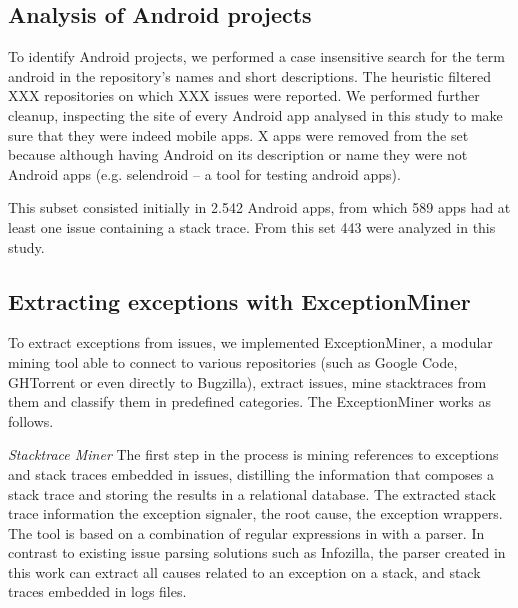 \documentclass[conference]{IEEEtran}
\begin{document}
\subsection{Analysis of Android projects}
\label{sec:android}

To identify Android projects, we performed a case insensitive search for the 
term \textsf{android} in the repository's names and short descriptions.
The heuristic filtered XXX repositories on which XXX issues were reported. 
We performed further cleanup, inspecting the site of every Android app analysed in this 
study to make sure that they were indeed mobile apps. X apps were removed from the
set because although having Android on its description or name they were not Android apps (e.g. 
\textsf{selendroid} -- a tool for testing android apps).

This subset consisted initially in 2.542 Android apps, from which 589 apps had at least one issue containing a stack trace. From this set 443 were analyzed in this study. 


\subsection{Extracting exceptions with ExceptionMiner}
\label{sec:exceptionminer}

To extract exceptions from issues, we implemented ExceptionMiner, a modular mining tool
able to connect to various repositories (such as Google Code, GHTorrent or even directly to
Bugzilla), extract issues, mine stacktraces from them and classify them in predefined categories.
The ExceptionMiner works as follows.

\noindent\emph{Stacktrace Miner} The first step in the process is mining references to exceptions and 
stack traces embedded in issues, distilling the information that composes a stack trace and storing
the results in a relational database. The extracted stack trace information  the exception signaler, the root cause, the exception wrappers. The tool is based on a combination of regular expressions in with a parser. In contrast to existing issue parsing 
solutions such as Infozilla, the parser created in this work can extract all causes related to an 
exception on a stack, and stack traces embedded in logs files.
\end{document}
